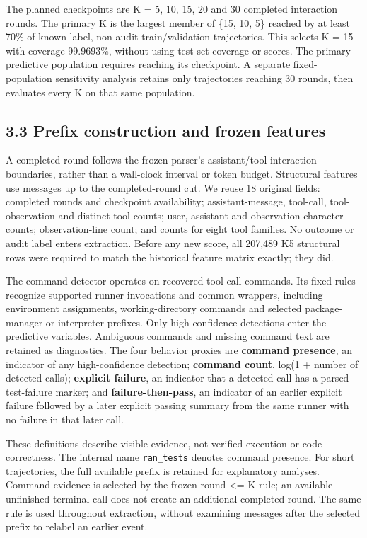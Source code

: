 \documentclass[10pt,a4paper]{article}
\begin{document}
The planned checkpoints are K = 5, 10, 15, 20 and 30 completed interaction rounds. The primary K is the largest member of \{15, 10, 5\} reached by at least 70\% of known-label, non-audit train/validation trajectories. This selects K = 15 with coverage 99.9693\%, without using test-set coverage or scores. The primary predictive population requires reaching its checkpoint. A separate fixed-population sensitivity analysis retains only trajectories reaching 30 rounds, then evaluates every K on that same population.

\subsection{3.3 Prefix construction and frozen features}
A completed round follows the frozen parser's assistant/tool interaction boundaries, rather than a wall-clock interval or token budget. Structural features use messages up to the completed-round cut. We reuse 18 original fields: completed rounds and checkpoint availability; assistant-message, tool-call, tool-observation and distinct-tool counts; user, assistant and observation character counts; observation-line count; and counts for eight tool families. No outcome or audit label enters extraction. Before any new score, all 207,489 K5 structural rows were required to match the historical feature matrix exactly; they did.

The command detector operates on recovered tool-call commands. Its fixed rules recognize supported runner invocations and common wrappers, including environment assignments, working-directory commands and selected package-manager or interpreter prefixes. Only high-confidence detections enter the predictive variables. Ambiguous commands and missing command text are retained as diagnostics. The four behavior proxies are \textbf{command presence}, an indicator of any high-confidence detection; \textbf{command count}, log(1 + number of detected calls); \textbf{explicit failure}, an indicator that a detected call has a parsed test-failure marker; and \textbf{failure-then-pass}, an indicator of an earlier explicit failure followed by a later explicit passing summary from the same runner with no failure in that later call.

These definitions describe visible evidence, not verified execution or code correctness. The internal name \texttt{ran\_tests} denotes command presence. For short trajectories, the full available prefix is retained for explanatory analyses. Command evidence is selected by the frozen round \textless{}= K rule; an available unfinished terminal call does not create an additional completed round. The same rule is used throughout extraction, without examining messages after the selected prefix to relabel an earlier event.
\end{document}
